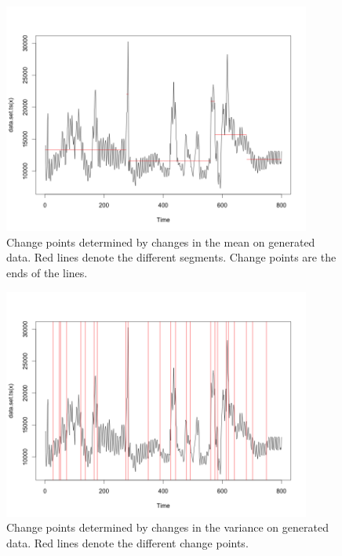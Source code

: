 \documentclass[minf,twoside,singlespacing,parskip,frontabs,notimes,12pt]{infthesis} %
\begin{document}
\begin{figure}[]
\begin{center}
\includegraphics[width=0.9\textwidth]{fictional_town_mean}
\end{center}
\caption{Change points determined by changes in the mean on generated data. Red lines denote the different segments. Change points are the ends of the lines.}
\label{mean-best-output}
\end{figure}
\begin{figure}[]
\begin{center}
\includegraphics[width=0.9\textwidth]{changes_in_var}
\end{center}
\caption{Change points determined by changes in the variance on generated data. Red lines denote the different change points.}
\label{var-best-output}
\end{figure}
\end{document}
